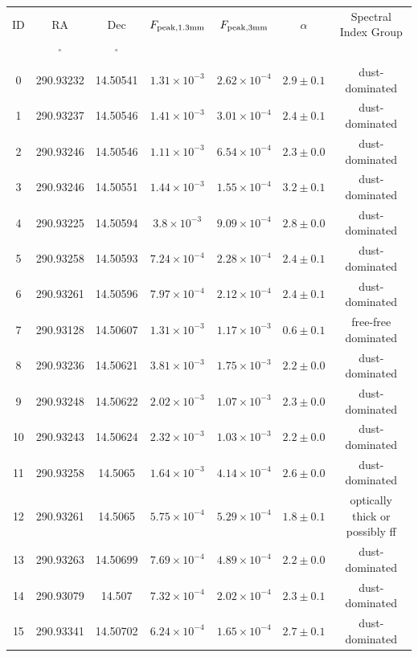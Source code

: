 \begin{table}
\begin{tabular}{ccccccc}
ID & RA & Dec & $F_{\rm peak, 1.3mm}$ & $F_{\rm peak, 3mm}$ & $\alpha$ & Spectral Index Group \\
 & $\mathrm{{}^{\circ}}$ & $\mathrm{{}^{\circ}}$ &  &  &  &  \\
0 & 290.93232 & 14.50541 & $1.31\times10^{-3}$ & $2.62\times10^{-4}$ & $2.9\pm0.1$ & dust-dominated \\
1 & 290.93237 & 14.50546 & $1.41\times10^{-3}$ & $3.01\times10^{-4}$ & $2.4\pm0.1$ & dust-dominated \\
2 & 290.93246 & 14.50546 & $1.11\times10^{-3}$ & $6.54\times10^{-4}$ & $2.3\pm0.0$ & dust-dominated \\
3 & 290.93246 & 14.50551 & $1.44\times10^{-3}$ & $1.55\times10^{-4}$ & $3.2\pm0.1$ & dust-dominated \\
4 & 290.93225 & 14.50594 & $3.8\times10^{-3}$ & $9.09\times10^{-4}$ & $2.8\pm0.0$ & dust-dominated \\
5 & 290.93258 & 14.50593 & $7.24\times10^{-4}$ & $2.28\times10^{-4}$ & $2.4\pm0.1$ & dust-dominated \\
6 & 290.93261 & 14.50596 & $7.97\times10^{-4}$ & $2.12\times10^{-4}$ & $2.4\pm0.1$ & dust-dominated \\
7 & 290.93128 & 14.50607 & $1.31\times10^{-3}$ & $1.17\times10^{-3}$ & $0.6\pm0.1$ & free-free dominated \\
8 & 290.93236 & 14.50621 & $3.81\times10^{-3}$ & $1.75\times10^{-3}$ & $2.2\pm0.0$ & dust-dominated \\
9 & 290.93248 & 14.50622 & $2.02\times10^{-3}$ & $1.07\times10^{-3}$ & $2.3\pm0.0$ & dust-dominated \\
10 & 290.93243 & 14.50624 & $2.32\times10^{-3}$ & $1.03\times10^{-3}$ & $2.2\pm0.0$ & dust-dominated \\
11 & 290.93258 & 14.5065 & $1.64\times10^{-3}$ & $4.14\times10^{-4}$ & $2.6\pm0.0$ & dust-dominated \\
12 & 290.93261 & 14.5065 & $5.75\times10^{-4}$ & $5.29\times10^{-4}$ & $1.8\pm0.1$ & optically thick or possibly ff \\
13 & 290.93263 & 14.50699 & $7.69\times10^{-4}$ & $4.89\times10^{-4}$ & $2.2\pm0.0$ & dust-dominated \\
14 & 290.93079 & 14.507 & $7.32\times10^{-4}$ & $2.02\times10^{-4}$ & $2.3\pm0.1$ & dust-dominated \\
15 & 290.93341 & 14.50702 & $6.24\times10^{-4}$ & $1.65\times10^{-4}$ & $2.7\pm0.1$ & dust-dominated \\

\end{tabular}
\end{table}
